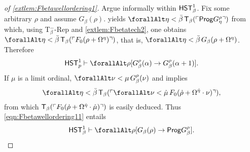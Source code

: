 \documentclass[UKenglish,cleveref,DIV=12]{scrartcl}
\let\forall\forallAlt
\theoremstyle{definition}
\theoremstyle{definition}
\begin{document}
\begin{proof}[of \cref{extlem:Fbetawellordering1}]
Argue informally within $\mathsf{HST}_\beta^1$. Fix some arbitrary $\rho$ and assume $G_\beta(\rho)$.
 yields $\forall\eta<\bar\beta\,\T_\beta(\gn{\Prog
G_\eta^\rho})$ from which, using T$^-_\beta$-Rep and \cref{extlem:Fbetatech2},
one obtains
  $\forall\eta<\bar\beta\,\T_\beta(\gn{F_0(\rho+\Omega^\eta)})$,
that is, $\forall\eta<\bar\beta\,G_\beta(\rho+\Omega^\eta)$. Therefore
\begin{align}\label{eqn:Fbetawellordering11}
 \HST_p^1\proves\forall\rho[G_\beta^\rho(\alpha)\rightarrow G_\beta^\rho(\alpha+1)].
\end{align}
If $\mu$ is a limit ordinal, $\forall\nu<\mu\,G_\beta^\rho(\nu)$ and
\Uni\beta implies
\begin{align*}
\forall\eta<\bar\beta\,\T_\beta(\gn{\forall\nu<\dot\mu\,F_0(\dot\rho+\Omega^{\dot\eta}
\cdot\nu)}),
\end{align*}
from which $\mathsf{T}_\beta(\ulcorner{F_0(\dot\rho+\Omega^{\dot\eta}\cdot\dot\mu)}\urcorner)$ is easily
deduced. Thus \cref{eqn:Fbetawellordering11} entails
\begin{align*}
 \HST_\beta^1\proves\forall\rho[G_\beta(\rho)\rightarrow \Prog G_\beta^\rho].
\end{align*}


\end{proof}
\end{document}
